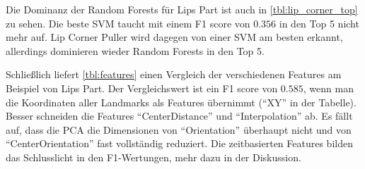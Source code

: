 

Die Dominanz der Random Forests für Lips Part ist auch in
\cref{tbl:lip_corner_top} zu sehen. Die beste SVM taucht mit einem F1 score von
$0.356$ in den Top 5 nicht mehr auf. Lip Corner Puller wird dagegen von einer
SVM am besten erkannt, allerdings dominieren wieder Random Forests in den Top 5.


Schließlich liefert \cref{tbl:features} einen Vergleich der verschiedenen
Features am Beispiel von Lips Part. Der Vergleichswert ist ein F1 score von
$0.585$, wenn man die Koordinaten aller Landmarks als Features übernimmt (``XY''
in der Tabelle). Besser schneiden die Features ``CenterDistance'' und
``Interpolation'' ab. Es fällt auf, dass die PCA die Dimensionen von
``Orientation'' überhaupt nicht und von ``CenterOrientation'' fast vollständig reduziert. Die zeitbasierten Features bilden das Schlusslicht in den
F1-Wertungen, mehr dazu in der Diskussion.

